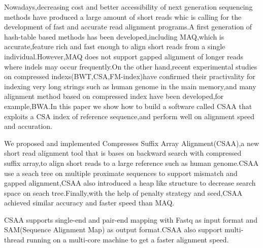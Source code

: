 \begin{englishabstract}
Nowadays,decreasing cost and better accessibility of next generation sequencing methods
have produced a large amount of short reads whic is calling for the development of fast
and accurate read alignment programs.A first generation of hash-table based methods has
been developed,including MAQ,which is accurate,feature rich and fast enough to align short
reads from a single individual.However,MAQ does not support gapped alignment of longer reads
where indels may occur frequently.On the other hand,recent experimental studies on compressed
indexs(BWT,CSA,FM-index)have confirmed their practivality for indexing very long strings such
as human genome in the main memory,and many alignment method based on compressed index have
been developed,for example,BWA.In this paper we show how to build a software called CSAA that
exploits a CSA index of reference sequence,and perform well on alignment speed and accuration.

We proposed and implemented Compresses Suffix Array Alignment(CSAA),a new short read alignment
tool that is bases on backward search with compressed suffix array,to align short reads to a
large reference such as human genome.CSAA use a seach tree on multiple proximate sequences to
support mismatch and gapped alignment,CSAA also introduced a heap like structure to decrease
search space on seach tree.Finally,with the help of penalty strategy and seed,CSAA achieved
similar accuracy and faster speed than MAQ.

CSAA supports single-end and pair-end mapping with Fastq as input format and SAM(Sequence Alignment Map)
as output format.CSAA also support multi-thread running on a multi-core machine to get a faster
alignment speed.

\end{englishabstract}

